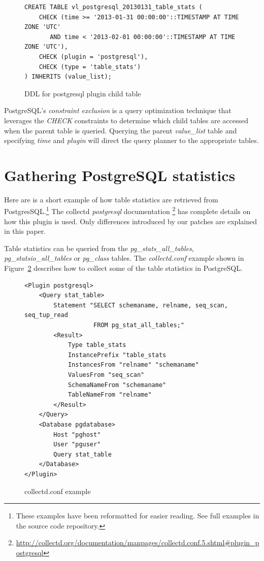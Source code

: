 \documentclass[twocolumn,letterpaper]{article}
\begin{document}
\begin{figure}
  \lstset{language=sql}
  \begin{lstlisting}
CREATE TABLE vl_postgresql_20130131_table_stats (
    CHECK (time >= '2013-01-31 00:00:00'::TIMESTAMP AT TIME ZONE 'UTC'
       AND time < '2013-02-01 00:00:00'::TIMESTAMP AT TIME ZONE 'UTC'),
    CHECK (plugin = 'postgresql'),
    CHECK (type = 'table_stats')
) INHERITS (value_list);
  \end{lstlisting}
  \caption{DDL for postgresql plugin child table}
  \label{fig:postgresql_ddl}
\end{figure}

PostgreSQL's \textit{constraint exclusion} is a query optimization technique
that leverages the \textit{CHECK} constraints to determine which child tables
are accessed when the parent table is queried.  Querying the parent
\textit{value\_list} table and specifying \textit{time} and \textit{plugin}
will direct the query planner to the appropriate tables.

\section{Gathering PostgreSQL statistics}

Here are is a short example of how table statistics are retrieved from
PostgresSQL.\footnote{These examples have been reformatted for easier reading.
See full examples in the source code repository.}  The collectd
\textit{postgresql} documentation
\footnote{\url{http://collectd.org/documentation/manpages/collectd.conf.5.shtml#plugin_postgresql}}
has complete details on how this plugin is used.  Only differences introduced
by our patches are explained in this paper.

Table statistics can be queried from the \textit{pg\_stats\_all\_tables},
\textit{pg\_statsio\_all\_tables} or \textit{pg\_class} tables.  The
\textit{collectd.conf} example shown in Figure~\ref{fig:collectd_conf}
describes how to collect some of the table statistics in PostgreSQL.

\begin{figure}
  \lstset{language=xml}
  \begin{lstlisting}
<Plugin postgresql>
	<Query stat_table>
		Statement "SELECT schemaname, relname, seq_scan, seq_tup_read
		           FROM pg_stat_all_tables;"
		<Result>
			Type table_stats
			InstancePrefix "table_stats
			InstancesFrom "relname" "schemaname"
			ValuesFrom "seq_scan"
			SchemaNameFrom "schemaname"
			TableNameFrom "relname"
		</Result>
	</Query>
	<Database pgdatabase>
		Host "pghost"
		User "pguser"
		Query stat_table
	</Database>
</Plugin>
  \end{lstlisting}
  \caption{collectd.conf example}
  \label{fig:collectd_conf}
\end{figure}
\end{document}
